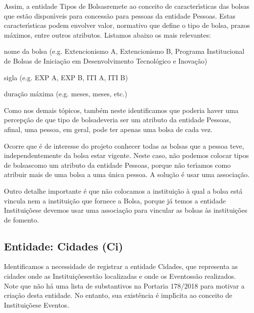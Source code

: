 \documentclass[
12pt,		%
openright,	%
twoside,  %
a4paper,			%
chapter=TITLE,		%
english,			%
french,				%
spanish,			%
brazil				%
]{USPSC-classe/USPSC}
\begin{document}
Assim, a entidade \textquotedbl Tipos de Bolsas\textquotedbl  remete ao conceito de caracter\'{\i}sticas das bolsas que est\~ao dispon\'{\i}veis para concess\~ao para pessoas da entidade \textquotedbl Pessoas\textquotedbl . Estas caracter\'{\i}sticas podem envolver valor, normativo que define o tipo de bolsa, prazos m\'aximos, entre outros atributos. Listamos abaixo os mais relevantes:





\begin{alineas}
\item nome da bolsa (e.g. \textquotedbl Extencionismo A\textquotedbl , \textquotedbl Extencionismo B\textquotedbl , \textquotedbl Programa Institucional de Bolsas de Inicia\c{c}\~ao em Desenvolvimento Tecnol\'ogico e Inova\c{c}\~ao\textquotedbl )
\item sigla (e.g. EXP A, EXP B, ITI A, ITI B)
\item dura\c{c}\~ao m\'axima (e.g.  meses\textquotedbl ,  meses\textquotedbl , etc.)
\end{alineas}

Como nos demais t\'opicos, tamb\'em neste identificamos que poderia haver uma percep\c{c}\~ao de que \textquotedbl tipo de bolsa\textquotedbl  deveria ser um atributo da entidade \textquotedbl Pessoas\textquotedbl , afinal, uma pessoa, em geral, pode ter apenas uma bolsa de cada vez.




Ocorre que \'e de interesse do projeto conhecer todas as bolsas que a pessoa teve, independentemente da bolsa estar vigente. Neste caso, n\~ao podemos colocar \textquotedbl tipos de bolsas\textquotedbl  como um atributo da entidade \textquotedbl Pessoas\textquotedbl , porque n\~ao ter\'{\i}amos como atribuir mais de uma bolsa a uma \'unica pessoa. A solu\c{c}\~ao \'e usar uma associa\c{c}\~ao.




Outro detalhe importante \'e que n\~ao colocamos a institui\c{c}\~ao \`a qual a bolsa est\'a vincula nem a institui\c{c}\~ao que fornece a Bolsa, porque j\'a temos a entidade \textquotedbl Institui\c{c}\~oes\textquotedbl  e devemos usar uma associa\c{c}\~ao para vincular as bolsas \`as institui\c{c}\~oes de fomento.




\subsection[Entidade: Cidades (Ci)]{Entidade: Cidades (Ci)}\label{Entidade: Cidades (Ci)}
Identificamos a necessidade de registrar a entidade \textquotedbl Cidades\textquotedbl , que representa as cidades onde as \textquotedbl Institui\c{c}\~oes\textquotedbl  est\~ao localizadas e onde os \textquotedbl Eventos\textquotedbl  s\~ao realizados. Note que n\~ao h\'a uma lista de substantivos na Portaria 178/2018 para motivar a cria\c{c}\~ao desta entidade. No entanto, sua exist\^encia \'e impl\'{\i}cita ao conceito de \textquotedbl Institui\c{c}\~oes\textquotedbl  e \textquotedbl Eventos\textquotedbl .
\end{document}

